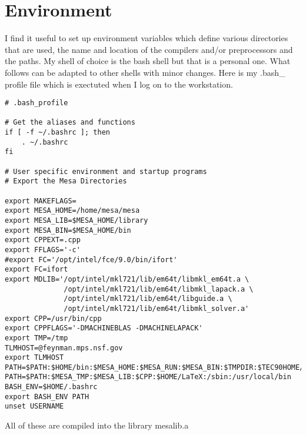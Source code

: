 \documentclass[onecolumn,letterpaper]{report}
\begin{document}
\section{Environment}
I find it useful to set up environment variables which define various directories that are
used, the name and location of the compilers and/or preprocessors and the paths.  My shell of
choice is the bash shell but that is a personal one.  What follows can be adapted to other 
shells with minor changes.
\newline
Here is my .bash\_ profile file which is exectuted when I log on to the workstation.
\newline
\begin{verbatim}
# .bash_profile

# Get the aliases and functions
if [ -f ~/.bashrc ]; then
	. ~/.bashrc
fi

# User specific environment and startup programs
# Export the Mesa Directories

export MAKEFLAGS=
export MESA_HOME=/home/mesa/mesa
export MESA_LIB=$MESA_HOME/library
export MESA_BIN=$MESA_HOME/bin
export CPPEXT=.cpp
export FFLAGS='-c'
#export FC='/opt/intel/fce/9.0/bin/ifort'
export FC=ifort
export MDLIB='/opt/intel/mkl721/lib/em64t/libmkl_em64t.a \
              /opt/intel/mkl721/lib/em64t/libmkl_lapack.a \
              /opt/intel/mkl721/lib/em64t/libguide.a \
              /opt/intel/mkl721/lib/em64t/libmkl_solver.a'
export CPP=/usr/bin/cpp
export CPPFLAGS='-DMACHINEBLAS -DMACHINELAPACK'
export TMP=/tmp
TLMHOST=@feynman.mps.nsf.gov
export TLMHOST
PATH=$PATH:$HOME/bin:$MESA_HOME:$MESA_RUN:$MESA_BIN:$TMPDIR:$TEC90HOME/bin
PATH=$PATH:$MESA_TMP:$MESA_LIB:$CPP:$HOME/LaTeX:/sbin:/usr/local/bin
BASH_ENV=$HOME/.bashrc
export BASH_ENV PATH
unset USERNAME
\end{verbatim}
All of these are compiled into the library mesalib.a
\end{document}
